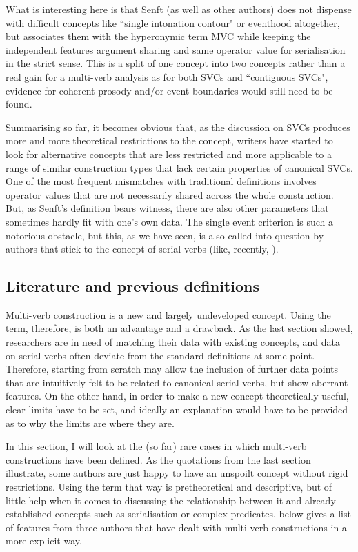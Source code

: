 What is interesting here is that Senft (as well as other authors) does not dispense with difficult concepts like ``single intonation contour" or eventhood altogether, but associates them with the hyperonymic term MVC while keeping the independent features argument sharing and same operator value for serialisation in the strict sense. This is a split of one concept into two concepts rather than a real gain for a multi-verb analysis as for both SVCs and ``contiguous SVCs", evidence for coherent prosody and/or event boundaries would still need to be found.

Summarising so far, it becomes obvious that, as the discussion on SVCs produces more and more theoretical restrictions to the concept, writers have started to look for alternative concepts that are less restricted and more applicable to a range of similar construction types that lack certain properties of canonical SVCs. One of the most frequent mismatches with traditional definitions involves operator values that are not necessarily shared across the whole construction. But, as Senft's definition bears witness, there are also other parameters that sometimes hardly fit with one's own data. The single event criterion is such a notorious obstacle, but this, as we have seen, is also called into question by authors that stick to the concept of serial verbs (like, recently, \citealt{haspelmath2016serial}). 

\subsection{Literature and previous definitions} \label{sec:literature-mvcs}

Multi-verb construction is a new and largely undeveloped concept. Using the term, therefore, is both an advantage and a drawback. As the last section showed, researchers are in need of matching their data with existing concepts, and data on serial verbs often deviate from the standard definitions at some point. Therefore, starting from scratch may allow the inclusion of further data points that are intuitively felt to be related to canonical serial verbs, but show aberrant features. On the other hand, in order to make a new concept theoretically useful, clear limits have to be set, and ideally an explanation would have to be provided as to why the limits are where they are. 

In this section, I will look at the (so far) rare cases in which multi-verb constructions have been defined. As the quotations from the last section illustrate, some authors are just happy to have an unspoilt concept without rigid restrictions. Using the term that way is pretheoretical and descriptive, but of little help when it comes to discussing the relationship between it and already established concepts such as serialisation or complex predicates.  below gives a list of features from three authors that have dealt with multi-verb constructions in a more explicit way.

